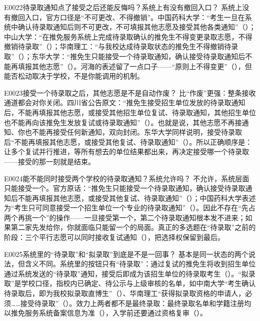 \begin{qa}{E0022}{待录取通知点了接受之后还能反悔吗？系统上有没有撤回入口？}
系统上没有撤回入口，官方口径是“不可更改、不得撤销”。中国药科大学：“考生一旦在系统中确认待录取通知后则不可更改，不可填报其他志愿及接受其他各类通知”（）；中山大学：“在推免服务系统上完成待录取确认的推免生不得变更录取志愿，不得撤销待录取”（）；华南理工：“与我校达成待录取状态的推免生不得撤销待录取”（）；东华大学：“推免生只能接受一个待录取通知，确认接受待录取通知后不能再填报其他志愿”（）。河海的表述留了一点口子——“原则上不得变更”（），但能否松动取决于学校，不是你能调用的机制。
\end{qa}

\begin{qa}{E0023}{接受一个待录取之后，其他志愿是不是自动作废？}
比“作废”更强：整条接收通道都会对你关闭。四川省公告原文：“推免生接受招生单位发放的待录取通知后，不能再填报其他志愿，或接受其他招生单位复试、待录取通知，其他招生单位也不能再向该推免生发放复试或待录取通知”（）。也就是说，其他志愿不再接通知、你也不能再接受任何新通知，双向封闭。东华大学同样说明，接受待录取后“不能再填报其他志愿，或接受其他复试、待录取通知”（）。所以正确顺序是：让多个复试并行推进，等所有想去的单位结果都出来，再决定接受哪一个待录取——接受的那一刻就是结束。
\end{qa}

\begin{qa}{E0024}{能不能同时接受两个学校的待录取通知？系统允许吗？}
不允许，系统层面只能接受一个。官方原话：“推免生只能接受一个待录取通知，确认接受待录取通知后不能再填报其他志愿，或接受其他复试、待录取通知”（）；中国药科大学表述为“考生只可同意接受一个招生单位一个专业的待录取通知”（）。因此不存在“先占两个再挑一个”的操作——一旦接受第一个，第二个待录取通知根本发不进来；如果第二家先发给你，你就面临只能留一个的局面。真正的多选题在“待录取”之前的阶段：三个平行志愿可以同时接收复试通知（），把选择权保留到最后。
\end{qa}

\begin{qa}{E0025}{系统里的“待录取”和“拟录取”到底是不是一回事？}
基本是同一状态的两个说法，但含义不同。系统里的按钮只有“待录取”：通过复试的推免生将收到招生单位通过系统发送的“待录取”通知，接受后即成为该招生单位的待录取考生（）。“拟录取”是学校口径，指校内已确定、待公示与上级审核的名单，如中南大学“考生确认待录取后，即为我校拟录取直博生”（）、华南理工“获得拟录取资格的申请人，必须……接受待录取”（）。效力上两者都不是最终录取：最终录取名单和学籍注册均以推免服务系统备案信息为准（），入学前还要通过资格复审（）。
\end{qa}

